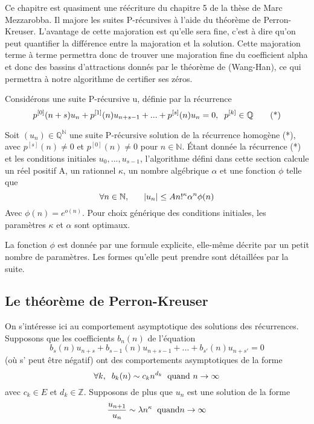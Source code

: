 \documentclass[a4paper,10.5pt]{article}
\begin{document}
	Ce chapitre est quasiment une réécriture du chapitre 5 de la thèse de Marc Mezzarobba. Il majore les suites P-récursives à l'aide du théorème de Perron-Kreuser.
	L'avantage de cette majoration est qu'elle sera fine, c'est à dire qu'on peut quantifier la différence entre la majoration et la solution.
	Cette majoration terme à terme permettra donc de trouver une majoration fine du coefficient alpha et donc des bassins d'attractions donnés par le théorème de (Wang-Han), ce qui permettra à notre algorithme de certifier ses zéros.
	
	Considérons une suite P-récursive u, définie par la récurrence
	\[p^{[0]}(n+s)u_{n}+p^{[1]}(n)u_{n+s-1}+...+p^{[s]}(n)u_{n}=0,\hspace{2mm} p^{[k]}\in \mathbb{Q} \tag{*}\] 
	\begin{theorem}Soit $(u_{n})\in \mathbb{Q}^{\mathbb{N}}$ une suite P-récursive solution de la récurrence homogène (*), avec $p^{[s]}(n) \neq 0$ et $p^{[0]}(n) \neq 0$ pour $n \in \mathbb{N}$. Étant donnée la récurrence (*) et les conditions initiales $u_{0},...,u_{s-1}$, l'algorithme défini dans cette section calcule un réel positif A, un rationnel $\kappa$, un nombre algébrique $\alpha$  et une fonction $\phi$ telle que
		\[\forall n\in \mathbb{N}, \hspace{6mm}|u_{n}| \leq A n!^{\kappa}\alpha^{n}\phi(n)\]
		Avec $\phi(n)=e^{o(n)}$. Pour choix générique des conditions initiales, les paramètres $\kappa$ et $\alpha$ sont optimaux.
	\end{theorem}
	
	La fonction $\phi$ est donnée par une formule explicite, elle-même décrite par un petit nombre de paramètres. Les formes qu'elle peut prendre sont détaillées par la suite.
	
	\subsection{Le théorème de Perron-Kreuser}
	
	On s'intéresse ici au comportement asymptotique des solutions des récurrences. Supposons que les coefficients $b_{n}(n)$ de l'équation
	\[b_{s}(n)u_{n+s}+b_{s-1}(n)u_{n+s-1}+...+b_{s'}(n)u_{n+s'}=0  \tag{*}\]
	(où s' peut être négatif) ont des comportements asymptotiques de la forme
	\[\forall k, \hspace{2mm} b_{k}(n) \sim c_{k}n^{d_{k}} \hspace{2mm} \text{quand } n \rightarrow \infty\]
	avec $c_{k} \in E$ et $d_{k} \in \mathbb{Z}$. Supposons de plus que $u_{n}$ est une solution de la forme  
	\[\frac{u_{n+1}}{u_{n}}\sim \lambda n^{\kappa} \hspace{2mm} \text{quand}n \rightarrow \infty\]
	
\end{document}
